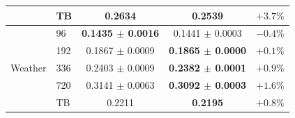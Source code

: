 \begin{table}[H]
\begin{tabular}{@{}llccr@{}}
 & TB & 0.2634 & \textbf{0.2539} & $+3.7\%$\\
\midrule
\multirow{5}{*}{Weather} & 96 & \textbf{0.1435 $\pm$ 0.0016} & 0.1441 $\pm$ 0.0003 & $-0.4\%$\\
 & 192 & 0.1867 $\pm$ 0.0009 & \textbf{0.1865 $\pm$ 0.0000} & $+0.1\%$\\
 & 336 & 0.2403 $\pm$ 0.0009 & \textbf{0.2382 $\pm$ 0.0001} & $+0.9\%$\\
 & 720 & 0.3141 $\pm$ 0.0063 & \textbf{0.3092 $\pm$ 0.0003} & $+1.6\%$\\
 & TB & 0.2211 & \textbf{0.2195} & $+0.8\%$\\
\bottomrule
\end{tabular}
\end{table}

